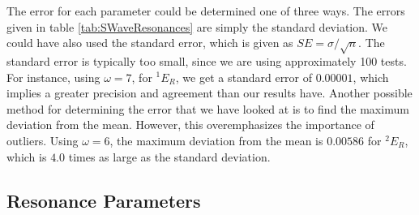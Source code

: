 \documentclass[Dissertation.tex]{subfiles}
\begin{document}
The error for each parameter could be determined one of three ways.  The errors given in table \ref{tab:SWaveResonances} are simply the standard deviation.  We could have also used the standard error, which is given as $SE = \sigma / \sqrt{n}$.  The standard error is typically too small, since we are using approximately 100 tests.  For instance, using $\omega = 7$, for $^1E_R$, we get a standard error of $0.00001$, which implies a greater precision and agreement than our results have.  Another possible method for determining the error that we have looked at is to find the maximum deviation from the mean.  However, this overemphasizes the importance of outliers.  Using $\omega = 6$, the maximum deviation from the mean is $0.00586$ for $^2E_R$, which is $4.0$ times as large as the standard deviation. 



\subsection{Resonance Parameters}
\end{document}
